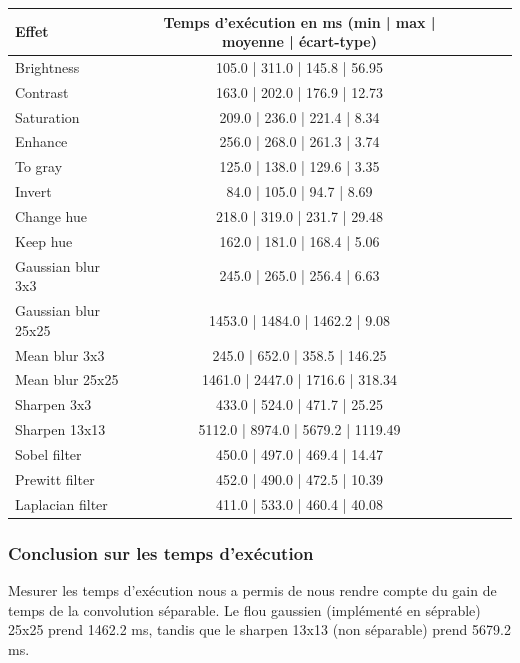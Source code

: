 \begin{tabular}{||l||c|c||c|c||}
    \hline
    \hline
    \textbf{Effet} & \textbf{Temps d'exécution en ms} (min | max | moyenne | écart-type)\\
    \hline
    \hline
    Brightness & 105.0 | 311.0 | 145.8 | 56.95\\
    \hline
    Contrast & 163.0 | 202.0 | 176.9 | 12.73\\
    \hline
    Saturation & 209.0 | 236.0 | 221.4 | 8.34\\
    \hline
    Enhance & 256.0 | 268.0 | 261.3 | 3.74\\
    \hline
    To gray & 125.0 | 138.0 | 129.6 | 3.35\\
    \hline
    Invert & 84.0 | 105.0 | 94.7 | 8.69\\
    \hline
    Change hue & 218.0 | 319.0 | 231.7 | 29.48\\
    \hline
    Keep hue & 162.0 | 181.0 | 168.4 | 5.06\\
    \hline
    Gaussian blur 3x3 & 245.0 | 265.0 | 256.4 | 6.63\\
    \hline
    Gaussian blur 25x25 & 1453.0 | 1484.0 | 1462.2 | 9.08\\
    \hline
    Mean blur 3x3 & 245.0 | 652.0 | 358.5 | 146.25\\
    \hline
    Mean blur 25x25 & 1461.0 | 2447.0 | 1716.6 | 318.34\\
    \hline
    Sharpen 3x3 & 433.0 | 524.0 | 471.7 | 25.25\\
    \hline
    Sharpen 13x13 & 5112.0 | 8974.0 | 5679.2 | 1119.49\\
    \hline
    Sobel filter & 450.0 | 497.0 | 469.4 | 14.47\\
    \hline
    Prewitt filter & 452.0 | 490.0 | 472.5 | 10.39\\
    \hline
    Laplacian filter & 411.0 | 533.0 | 460.4 | 40.08\\
    \hline
    \hline
  \end{tabular}

\subsubsection*{Conclusion sur les temps d'exécution}

Mesurer les temps d'exécution nous a permis de nous rendre compte du gain de temps de la convolution séparable. Le flou gaussien (implémenté en séprable) 25x25 prend 1462.2 ms, tandis que le sharpen 13x13 (non séparable) prend 5679.2 ms.  

